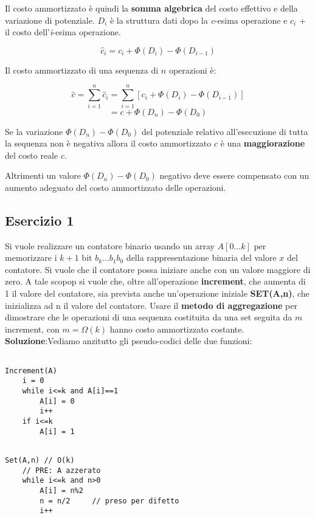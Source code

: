 Il costo ammortizzato è quindi la \textbf{somma algebrica} del costo effettivo e della variazione di potenziale. $D_i$ è la struttura dati dopo la \textit{c}-esima operazione e $c_i$ + il costo dell'\textit{i}-esima operazione.

$$\hat{c}_i=c_i+\Phi(D_i)-\Phi(D_{i-1})$$

Il costo ammortizzato di una sequenza di $n$ operazioni è:

$$\hat{c}=\sum_{i=1}^n\hat{c}_i=\sum_{i=1}^n[c_i+\Phi(D_i)-\Phi(D_{i-1})]$$
$$=c+\Phi(D_n)-\Phi(D_0)$$

Se la variazione $\Phi(D_n)-\Phi(D_0)$ del potenziale relativo all'esecuzione di tutta la sequenza non è negativa allora il costo ammortizzato $\hat{c}$ è una \textbf{maggiorazione} del costo reale $c$.

Altrimenti un valore $\Phi(D_n)-\Phi(D_0)$ negativo deve essere compensato con un aumento adeguato del costo ammortizzato delle operazioni.

\subsection{Esercizio 1}

Si vuole realizzare un contatore binario usando un array $A[0...k]$ per memorizzare i $k+1$ bit $b_k...b_1b_0$ della rappresentazione binaria del valore $x$ del contatore. Si vuole che il contatore possa iniziare anche con un valore maggiore di zero. A tale scopop si vuole che, oltre all'operazione \textbf{increment}, che aumenta di 1 il valore del contatore, sia prevista anche un'operazione iniziale \textbf{SET(A,n)}, che inizializza ad n il valore del contatore.
Usare il \textbf{metodo di aggregazione} per dimostrare che le operazioni di una sequenza costituita da una set seguita da $m$ increment, con $m=\Omega(k)$ hanno costo ammortizzato costante.
\linebreak
\linebreak
\textbf{Soluzione}:Vediamo anzitutto gli pseudo-codici delle due funzioni:

\begin{lstlisting}

Increment(A)
	i = 0
	while i<=k and A[i]==1
		A[i] = 0
		i++
	if i<=k
		A[i] = 1

\end{lstlisting}

\begin{lstlisting}

Set(A,n) // O(k)
	// PRE: A azzerato
	while i<=k and n>0
		A[i] = n%2
		n = n/2     // preso per difetto
		i++

\end{lstlisting}

